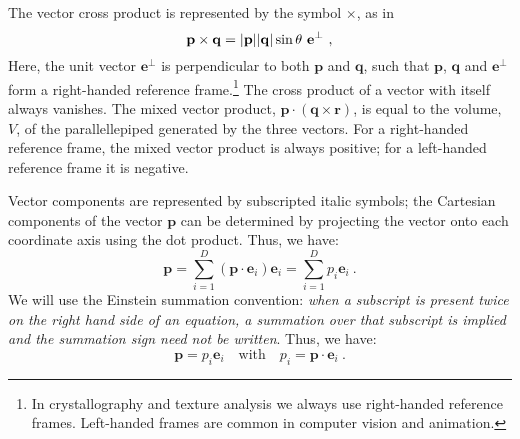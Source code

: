 The vector cross product is represented by the symbol $\times$, as in
\begin{equation}
	\mathbf{p}\times\mathbf{q} = \vert\mathbf{p}\vert\vert\mathbf{q}\vert \sin\theta\ \mathbf{e}^{\perp} \ ,\OClabel{eq:crossproduct}
\end{equation}
Here, the unit vector $\mathbf{e}^{\perp}$ is perpendicular to both $\mathbf{p}$ and $\mathbf{q}$, such that $\mathbf{p}$, $\mathbf{q}$ and $\mathbf{e}^{\perp}$ form a right-handed reference frame.\footnote{In crystallography and texture analysis we always use right-handed reference frames. Left-handed frames are common in computer vision and animation.}   The cross product of a vector with itself always vanishes. The mixed vector product, $\mathbf{p}\cdot(\mathbf{q}\times\mathbf{r})$, is equal to the volume, $V$, of the parallellepiped generated by the three vectors.  For a right-handed reference frame, the mixed vector product is always positive; for  a left-handed reference frame it is negative.

Vector components are represented by subscripted italic symbols; the Cartesian components of the vector $\mathbf{p}$ can be determined by projecting the vector onto each coordinate axis using the dot product.  Thus, we have:
\begin{equation}
	\mathbf{p} = \sum_{i=1}^{D}(\mathbf{p}\cdot\mathbf{e}_i)\mathbf{e}_i = \sum_{i=1}^D p_i\mathbf{e}_i \ .
\end{equation}
We will use the Einstein summation convention: \textit{when a subscript is present twice on the right hand side of an equation, a summation over that subscript is implied and the summation sign need not be written}.  
Thus, we have:
\begin{equation}
	\mathbf{p} = p_i\mathbf{e}_i\quad\text{with}\quad p_i = \mathbf{p}\cdot\mathbf{e}_i \ .
\end{equation}

